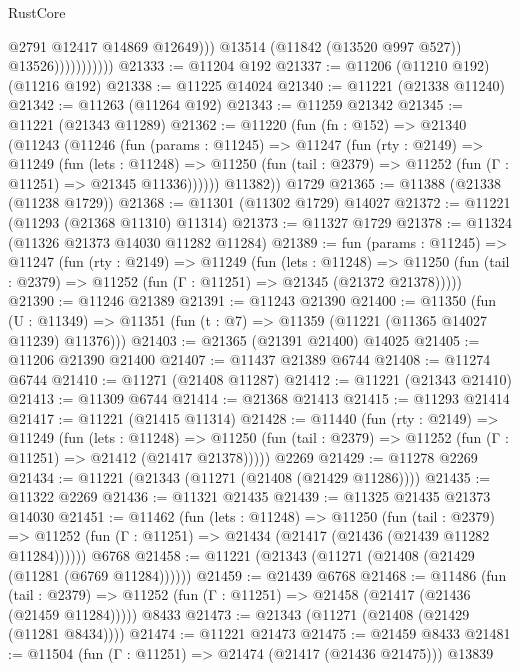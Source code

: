 \begin{lexlean}{RustCore}
\begin{coremodule}
                                @2791
                                @12417
                                @14869
                                @12649)))
                          @13514
                          (@11842 (@13520 @997 @527))
                          @13526)))))))))))
@21333 := @11204 @192
@21337 := @11206 (@11210 @192) (@11216 @192)
@21338 := @11225 @14024
@21340 := @11221 (@21338 @11240)
@21342 := @11263 (@11264 @192)
@21343 := @11259 @21342
@21345 := @11221 (@21343 @11289)
@21362 := @11220
    (fun (fn : @152) =>
    @21340
      (@11243
        (@11246
          (fun (params : @11245) =>
          @11247
            (fun (rty : @2149) =>
            @11249
              (fun (lets : @11248) =>
              @11250 (fun (tail : @2379) => @11252 (fun (Γ : @11251) => @21345 @11336))))))
        @11382))
    @1729
@21365 := @11388 (@21338 (@11238 @1729))
@21368 := @11301 (@11302 @1729) @14027
@21372 := @11221 (@11293 (@21368 @11310) @11314)
@21373 := @11327 @1729
@21378 := @11324 (@11326 @21373 @14030 @11282 @11284)
@21389 := fun (params : @11245) =>
  @11247
    (fun (rty : @2149) =>
    @11249
      (fun (lets : @11248) =>
      @11250 (fun (tail : @2379) => @11252 (fun (Γ : @11251) => @21345 (@21372 @21378)))))
@21390 := @11246 @21389
@21391 := @11243 @21390
@21400 := @11350
    (fun (U : @11349) => @11351 (fun (t : @7) => @11359 (@11221 (@11365 @14027 @11239) @11376)))
@21403 := @21365 (@21391 @21400) @14025
@21405 := @11206 @21390 @21400
@21407 := @11437 @21389 @6744
@21408 := @11274 @6744
@21410 := @11271 (@21408 @11287)
@21412 := @11221 (@21343 @21410)
@21413 := @11309 @6744
@21414 := @21368 @21413
@21415 := @11293 @21414
@21417 := @11221 (@21415 @11314)
@21428 := @11440
    (fun (rty : @2149) =>
    @11249
      (fun (lets : @11248) =>
      @11250 (fun (tail : @2379) => @11252 (fun (Γ : @11251) => @21412 (@21417 @21378)))))
    @2269
@21429 := @11278 @2269
@21434 := @11221 (@21343 (@11271 (@21408 (@21429 @11286))))
@21435 := @11322 @2269
@21436 := @11321 @21435
@21439 := @11325 @21435 @21373 @14030
@21451 := @11462
    (fun (lets : @11248) =>
    @11250
      (fun (tail : @2379) =>
      @11252 (fun (Γ : @11251) => @21434 (@21417 (@21436 (@21439 @11282 @11284))))))
    @6768
@21458 := @11221 (@21343 (@11271 (@21408 (@21429 (@11281 (@6769 @11284))))))
@21459 := @21439 @6768
@21468 := @11486
    (fun (tail : @2379) => @11252 (fun (Γ : @11251) => @21458 (@21417 (@21436 (@21459 @11284)))))
    @8433
@21473 := @21343 (@11271 (@21408 (@21429 (@11281 @8434))))
@21474 := @11221 @21473
@21475 := @21459 @8433
@21481 := @11504 (fun (Γ : @11251) => @21474 (@21417 (@21436 @21475))) @13839

\end{coremodule}
\end{lexlean}

